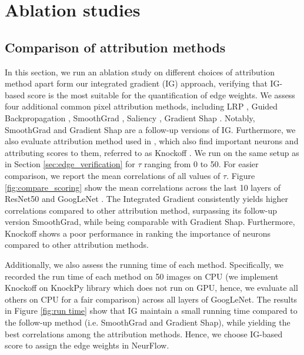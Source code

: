 \section{Ablation studies}
\subsection{Comparison of attribution methods}
\label{sec:compare_scoring}
In this section, we run an ablation study on different choices of attribution method apart form our integrated gradient (IG) approach, verifying that IG-based score is the most suitable for the quantification of edge weights. We assess four additional common pixel attribution methods, including LRP \citep{lrp}, Guided Backpropagation \citep{guided_backprop}, SmoothGrad \citep{smoothgrad}, Saliency \citep{saliency}, Gradient Shap \citep{shapley}. Notably, SmoothGrad and Gradient Shap are a follow-up versions of IG. Furthermore, we also evaluate attribution method used in \citet{NEUCEPT}, which also find important neurons and attributing scores to them, referred to as Knockoff \citep{knockoff}. We run on the same setup as in Section \ref{sec:edge_verification} for $\tau$ ranging from 0 to 50. For easier comparison, we report the mean correlations of all values of $\tau$. Figure \ref{fig:compare_scoring} show the mean correlations across the last 10 layers of ResNet50 \citep{Resnet} and GoogLeNet \citep{Googlenet}. The Integrated Gradient consistently yields higher correlations compared to other attribution method, surpassing its follow-up version SmoothGrad, {while being comparable with Gradient Shap}. Furthermore, Knockoff shows a poor performance in ranking the importance of neurons compared to other attribution methods.  

Additionally, we also assess the running time of each method. Specifically, we recorded the run time of each method on 50 images on CPU (we implement Knockoff on KnockPy library \citep{knockpy} which does not run on GPU, hence, we evaluate all others on CPU for a fair comparison) across all layers of GoogLeNet. The results in Figure \ref{fig:run time} show that IG maintain a small running time compared to the follow-up method (i.e. SmoothGrad and Gradient Shap), while yielding the best correlations among the attribution methods. Hence, we choose IG-based score to assign the edge weights in NeurFlow.

